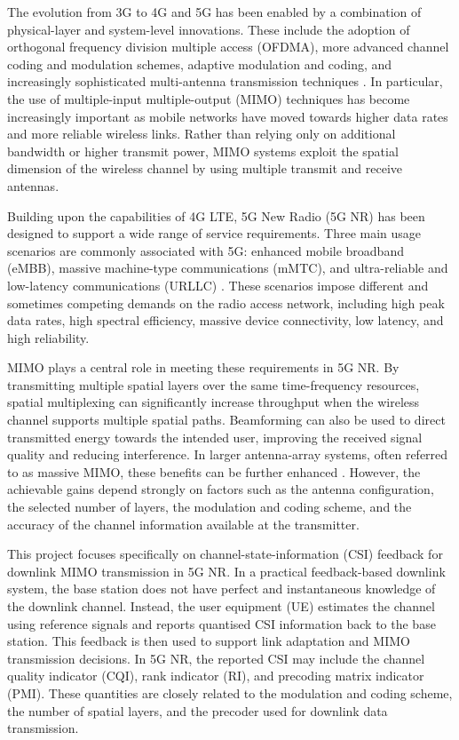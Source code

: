 \documentclass[a4paper,12pt,onecolumn]{article}
\begin{document}
	The evolution from 3G to 4G and 5G has been enabled by a combination of physical-layer and system-level innovations. These include the adoption of orthogonal frequency division multiple access (OFDMA), more advanced channel coding and modulation schemes, adaptive modulation and coding, and increasingly sophisticated multi-antenna transmission techniques \cite{Manikas}. In particular, the use of multiple-input multiple-output (MIMO) techniques has become increasingly important as mobile networks have moved towards higher data rates and more reliable wireless links. Rather than relying only on additional bandwidth or higher transmit power, MIMO systems exploit the spatial dimension of the wireless channel by using multiple transmit and receive antennas.

	Building upon the capabilities of 4G LTE, 5G New Radio (5G NR) has been designed to support a wide range of service requirements. Three main usage scenarios are commonly associated with 5G: enhanced mobile broadband (eMBB), massive machine-type communications (mMTC), and ultra-reliable and low-latency communications (URLLC) \cite[Ch.~1]{EricssonBook}. These scenarios impose different and sometimes competing demands on the radio access network, including high peak data rates, high spectral efficiency, massive device connectivity, low latency, and high reliability. 

	MIMO plays a central role in meeting these requirements in 5G NR. By transmitting multiple spatial layers over the same time-frequency resources, spatial multiplexing can significantly increase throughput when the wireless channel supports multiple spatial paths. Beamforming can also be used to direct transmitted energy towards the intended user, improving the received signal quality and reducing interference. In larger antenna-array systems, often referred to as massive MIMO, these benefits can be further enhanced \cite{Ericsson_MIMO}. However, the achievable gains depend strongly on factors such as the antenna configuration, the selected number of layers, the modulation and coding scheme, and the accuracy of the channel information available at the transmitter.

	This project focuses specifically on channel-state-information (CSI) feedback for downlink MIMO transmission in 5G NR. In a practical feedback-based downlink system, the base station does not have perfect and instantaneous knowledge of the downlink channel. Instead, the user equipment (UE) estimates the channel using reference signals and reports quantised CSI information back to the base station. This feedback is then used to support link adaptation and MIMO transmission decisions. In 5G NR, the reported CSI may include the channel quality indicator (CQI), rank indicator (RI), and precoding matrix indicator (PMI). These quantities are closely related to the modulation and coding scheme, the number of spatial layers, and the precoder used for downlink data transmission.
\end{document}
